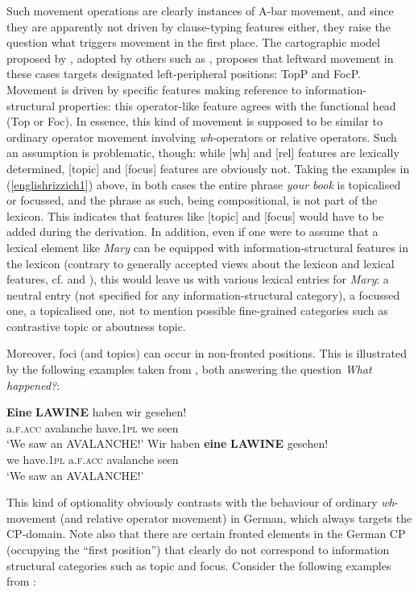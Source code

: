 Such movement operations are clearly instances of A-bar movement, and since they are apparently not driven by clause-typing features either, they raise the question what triggers movement in the first place. The cartographic model proposed by \citet{rizzi1997}, adopted by others such as \citet{poletto2006}, proposes that leftward movement in these cases targets designated left-peripheral positions: TopP and FocP. Movement is driven by specific features making reference to information-structural properties: this operator-like feature agrees with the functional head (Top or Foc). In essence, this kind of movement is supposed to be similar to ordinary operator movement involving \textit{wh}-operators or relative operators. Such an assumption is problematic, though: while [wh] and [rel] features are lexically determined, [topic] and [focus] features are obviously not. Taking the examples in (\ref{englishrizzich1}) above, in both cases the entire phrase \textit{your book} is topicalised or focussed, and the phrase as such, being compositional, is not part of the lexicon. This indicates that features like [topic] and [focus] would have to be added during the derivation. In addition, even if one were to assume that a lexical element like \textit{Mary} can be equipped with information-structural features in the lexicon (contrary to generally accepted views about the lexicon and lexical features, cf. \citealt{neelemanszendroei2004} and \citealt{dendikken2006}), this would leave us with various lexical entries for \textit{Mary}: a neutral entry (not specified for any information-structural category), a focussed one, a topicalised one, not to mention possible fine-grained categories such as contrastive topic or aboutness topic. 

Moreover, foci (and topics) can occur in non-fronted positions. This is illustrated by the following examples taken from \citet[172, ex. 6c and 6d]{fanselowlenertova2011}, both answering the question \textit{What happened?}:

\ea
\ea \gll \textbf{Eine} \textbf{LAWINE} haben wir gesehen!\\
a.\textsc{f.acc} avalanche have.\textsc{1pl} we seen\\
\glt `We saw an AVALANCHE!'
\ex \gll Wir haben \textbf{eine} \textbf{LAWINE} gesehen!\\
we have.\textsc{1pl} a.\textsc{f.acc} avalanche seen\\
\glt `We saw an AVALANCHE!'
\z
\z

This kind of optionality obviously contrasts with the behaviour of ordinary \textit{wh}-movement (and relative operator movement) in German, which always targets the CP-domain. Note also that there are certain fronted elements in the German CP (occupying the ``first position'') that clearly do not correspond to information structural categories such as topic and focus. Consider the following examples from \citet[173, ex. 7a]{fanselowlenertova2011}:

